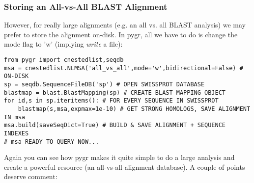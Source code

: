 \documentclass{howto}
\begin{document}
\subsubsection{Storing an All-vs-All BLAST Alignment}
However, for really large
alignments (e.g. an all vs. all BLAST analysis) we may prefer to store the alignment
on-disk.  In pygr, all we have to do is change the mode flag to 'w' (implying {\em write}
a file):
\begin{verbatim}
from pygr import cnestedlist,seqdb
msa = cnestedlist.NLMSA('all_vs_all',mode='w',bidirectional=False) # ON-DISK
sp = seqdb.SequenceFileDB('sp') # OPEN SWISSPROT DATABASE
blastmap = blast.BlastMapping(sp) # CREATE BLAST MAPPING OBJECT
for id,s in sp.iteritems(): # FOR EVERY SEQUENCE IN SWISSPROT
    blastmap(s,msa,expmax=1e-10) # GET STRONG HOMOLOGS, SAVE ALIGNMENT IN msa
msa.build(saveSeqDict=True) # BUILD & SAVE ALIGNMENT + SEQUENCE INDEXES
# msa READY TO QUERY NOW...
\end{verbatim}
Again you can see how pygr makes it quite simple to do a large analysis
and create a powerful resource (an all-vs-all alignment database).
A couple of points deserve comment:
\end{document}
